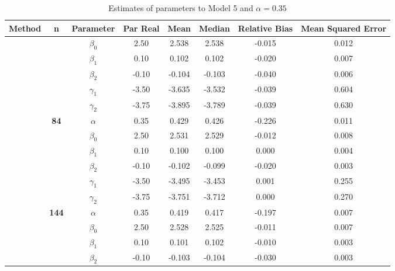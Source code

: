 \begin{table}[h]

\caption{\label{tab:Est_model_5_Alpha0.35}Estimates of parameters to Model 5 and $\alpha=0.35$}
\centering
\begin{tabular}[t]{>{}c>{}ccccccc}
\toprule
Method & n & Parameter & Par Real & Mean & Median & Relative Bias & Mean Squared Error\\
\midrule
 &  & $\beta_0$ & 2.50 & 2.538 & 2.538 & -0.015 & 0.012\\

 &  & $\beta_1$ & 0.10 & 0.102 & 0.102 & -0.020 & 0.007\\

 &  & $\beta_2$ & -0.10 & -0.104 & -0.103 & -0.040 & 0.006\\

 &  & $\gamma_1$ & -3.50 & -3.635 & -3.532 & -0.039 & 0.604\\

 &  & $\gamma_2$ & -3.75 & -3.895 & -3.789 & -0.039 & 0.630\\

 & \multirow{-6}{*}{\centering\arraybackslash \textbf{84}} & $\alpha$ & 0.35 & 0.429 & 0.426 & -0.226 & 0.011\\

 &  & $\beta_0$ & 2.50 & 2.531 & 2.529 & -0.012 & 0.008\\

 &  & $\beta_1$ & 0.10 & 0.100 & 0.100 & 0.000 & 0.004\\

 &  & $\beta_2$ & -0.10 & -0.102 & -0.099 & -0.020 & 0.003\\

 &  & $\gamma_1$ & -3.50 & -3.495 & -3.453 & 0.001 & 0.255\\

 &  & $\gamma_2$ & -3.75 & -3.751 & -3.712 & 0.000 & 0.270\\

 & \multirow{-6}{*}{\centering\arraybackslash \textbf{144}} & $\alpha$ & 0.35 & 0.419 & 0.417 & -0.197 & 0.007\\

 &  & $\beta_0$ & 2.50 & 2.528 & 2.525 & -0.011 & 0.007\\

 &  & $\beta_1$ & 0.10 & 0.101 & 0.102 & -0.010 & 0.003\\

 &  & $\beta_2$ & -0.10 & -0.103 & -0.104 & -0.030 & 0.003\\


\end{tabular}
\end{table}
